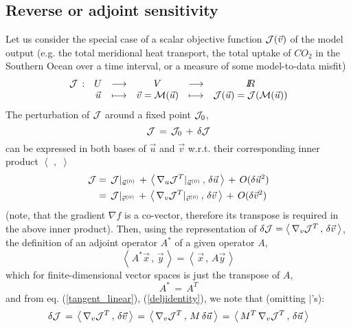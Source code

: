 \subsection{Reverse or adjoint sensitivity}
%
Let us consider the special case of a
scalar objective function ${\cal J}(\vec{v})$ of the model output (e.g. 
the total meridional heat transport, 
the total uptake of $CO_{2}$ in the Southern 
Ocean over a time interval,
or a measure of some model-to-data misfit)
%
\begin{eqnarray}
\begin{array}{cccccc}
{\cal J}  \, : &  U & 
\longrightarrow & V &   
\longrightarrow & I \!\! R \\
~       &  \vec{u} & \longmapsto     & \vec{v}={\cal M}(\vec{u}) & 
\longmapsto     & {\cal J}(\vec{u}) = {\cal J}({\cal M}(\vec{u}))
\end{array}
\label{compo}
\end{eqnarray}
%
The perturbation of $ {\cal J} $ around a fixed point $ {\cal J}_0 $,
\[
{\cal J} \, = \, {\cal J}_0 \, + \, \delta {\cal J}
\]
can be expressed in both bases of $ \vec{u} $ and $ \vec{v} $
w.r.t. their corresponding inner product 
$\left\langle \,\, , \,\, \right\rangle $ 
%
\begin{equation}
\begin{split}
{\cal J} & = \,
{\cal J} |_{\vec{u}^{(0)}} \, + \, 
\left\langle \, \nabla _{u}{\cal J}^T |_{\vec{u}^{(0)}} \, , \, \delta \vec{u} \, \right\rangle 
\, + \, O(\delta \vec{u}^2) \\
~ & = \,
{\cal J} |_{\vec{v}^{(0)}} \, + \, 
\left\langle \, \nabla _{v}{\cal J}^T |_{\vec{v}^{(0)}} \, , \, \delta \vec{v} \, \right\rangle
\, + \, O(\delta \vec{v}^2)
\end{split}
\label{deljidentity}
\end{equation}
%
(note, that the gradient $ \nabla f $ is a co-vector, therefore
its transpose is required in the above inner product).
Then, using the representation of 
$ \delta {\cal J} = 
\left\langle \, \nabla _{v}{\cal J}^T \, , \, \delta \vec{v} \, \right\rangle $,
the definition 
of an adjoint operator $ A^{\ast} $ of a given operator $ A $,
\[ 
\left\langle \, A^{\ast} \vec{x} \, , \, \vec{y} \, \right\rangle =
\left\langle \, \vec{x} \, , \,  A \vec{y} \, \right\rangle 
\]
which for finite-dimensional vector spaces is just the 
transpose of $ A $,
\[
A^{\ast} \, = \, A^T
\]
and from eq. (\ref{tangent_linear}), (\ref{deljidentity}),
we note that
(omitting $|$'s):
%
\begin{equation}
\delta {\cal J}
\, = \,
\left\langle \, \nabla _{v}{\cal J}^T \, , \, \delta \vec{v} \, \right\rangle
\, = \,
\left\langle \, \nabla _{v}{\cal J}^T \, , \, M \, \delta \vec{u} \, \right\rangle
\, = \, 
\left\langle \, M^T \, \nabla _{v}{\cal J}^T \, , \, 
\delta \vec{u} \, \right\rangle
\label{inner}
\end{equation}
